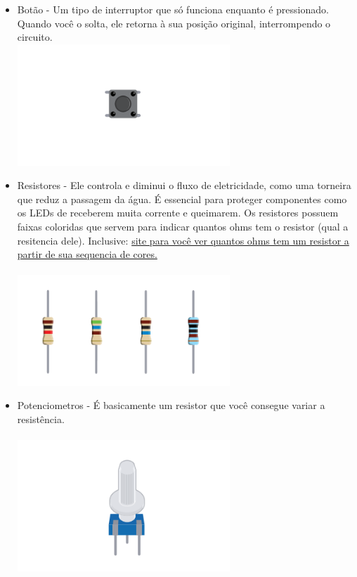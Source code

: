 \documentclass{report}
\begin{document}
\begin{itemize}
		\item Botão - Um tipo de interruptor que só funciona enquanto é pressionado. Quando você o solta, ele retorna à sua posição original, interrompendo o circuito. \\
		\includegraphics[width=8cm]{imagens/botao.png}
		
		\item Resistores - Ele controla e diminui o fluxo de eletricidade, como uma torneira que reduz a passagem da água. É essencial para proteger componentes como os LEDs de receberem muita corrente e queimarem. Os resistores possuem faixas coloridas que servem para indicar quantos ohms tem o resistor (qual a resitencia dele). Inclusive: \href{https://resistorcolorcode.in/?gad_source=1}{site para você ver quantos ohms tem um resistor a partir de sua sequencia de cores.} \\ \\
		\includegraphics[width=8cm]{imagens/resistores.png}
		
		\item Potenciometros - É basicamente um resistor que você consegue variar a resistência. \\ \\
		\includegraphics[width=8cm]{imagens/potenciometro.png}
		

\end{itemize}
\end{document}
